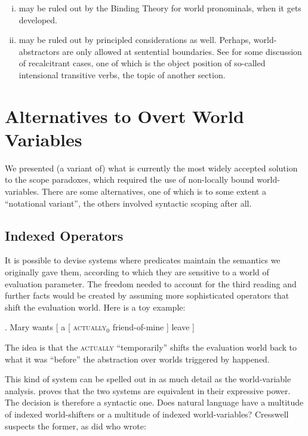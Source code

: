 \begin{enumerate}[(i)] 
  \item may be ruled out by the Binding Theory for world pronominals, when it gets developed. 
  \item may be ruled out by principled considerations as well. Perhaps, world-abstractors are only allowed at sentential boundaries. See \citet{larson:grammar-intensionality} for some discussion of recalcitrant cases, one of which is the object position of so-called intensional transitive verbs, the topic of another section. 
\end{enumerate}

\section{Alternatives to Overt World Variables }

We presented (a variant of) what is currently the most widely accepted solution to the scope paradoxes, which required the use of non-locally bound world-variables. There are some alternatives, one of which is to some extent a ``notational variant'', the others involved syntactic scoping after all.

\subsection{Indexed Operators}

It is possible to devise systems where predicates maintain the semantics we originally gave them, according to which they are sensitive to a world of evaluation parameter. The freedom needed to account for the third reading and further facts would be created by assuming more sophisticated operators that shift the evaluation world. Here is a toy example:

\ex. Mary wants [ a [ \textsc{actually}$_0$ friend-of-mine ] leave ]

The idea is that the \textsc{actually} ``temporarily'' shifts the evaluation world back to what it was ``before'' the abstraction over worlds triggered by  happened.

This kind of system can be spelled out in as much detail as the world-variable analysis. \citet{cresswell:entities} proves that the two systems are equivalent in their expressive power. The decision is therefore a syntactic one. Does natural language have a multitude of indexed world-shifters or a multitude of indexed world-variables? Cresswell suspects the former, as did \citet{kamp:now} who wrote:

